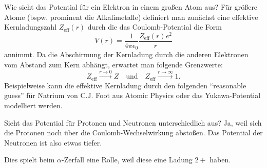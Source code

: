 \begin{fquestion}{Wie sieht das Potential für ein Elektron in einem großen Atom aus?}
    Für größere Atome (bspw. prominent die Alkalimetalle) definiert man zunächst eine effektive Kernladungszahl $Z_{\mathrm{eff}}(r)$ durch die das Coulomb-Potential die Form
    $$V(r) = \frac{1}{4\pi\epsilon_0} \frac{Z_{\mathrm{eff}}(r) e^2}{r}$$
    annimmt.
    Da die Abschirmung der Kernladung durch die anderen Elektronen vom Abstand zum Kern abhängt, erwartet man folgende Grenzwerte:
    $$Z_{\mathrm{eff}} \xrightarrow{r \rightarrow 0} Z \quad\text{und} \quad Z_{\mathrm{eff}} \xrightarrow{r \rightarrow \infty} 1.$$
    Beispielweise kann die effektive Kernladung durch den folgenden ``reasonable guess'' für Natrium von C.J. Foot aus Atomic Physics oder das Yukawa-Potential modelliert werden.
    \begin{center}
    \end{center}
\end{fquestion}

\begin{fquestion}{Sieht das Potential für Protonen und Neutronen unterschiedlich aus?}
    Ja, weil sich die Protonen noch über die Coulomb-Wechselwirkung abstoßen. 
    Das Potential der Neutronen ist also etwas tiefer.
    
    Dies spielt beim $\alpha$-Zerfall eine Rolle, weil diese eine Ladung $2+$ haben.
\end{fquestion}

